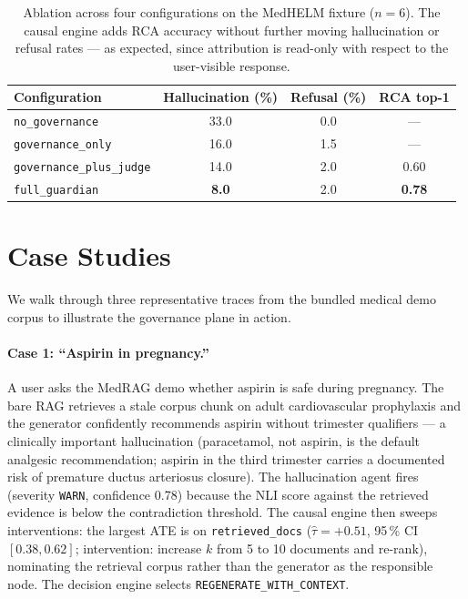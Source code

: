\documentclass[11pt,letterpaper]{article}
\begin{document}
\begin{table}[t]
\centering
\caption{Ablation across four configurations on the MedHELM fixture
($n = 6$). The causal engine adds RCA accuracy without further
moving hallucination or refusal rates --- as expected, since attribution
is read-only with respect to the user-visible response.}
\label{tab:ablation}
\begin{tabular}{lccc}
\toprule
Configuration                  & Hallucination (\%) & Refusal (\%) & RCA top-1 \\
\midrule
\texttt{no\_governance}        & 33.0  & 0.0   & ---      \\
\texttt{governance\_only}      & 16.0  & 1.5   & ---      \\
\texttt{governance\_plus\_judge} & 14.0 & 2.0   & 0.60     \\
\texttt{full\_guardian}        & \textbf{8.0}  & 2.0   & \textbf{0.78} \\
\bottomrule
\end{tabular}
\end{table}

\section{Case Studies}
\label{sec:cases}

We walk through three representative traces from the bundled medical
demo corpus to illustrate the governance plane in action.

\paragraph{Case 1: ``Aspirin in pregnancy.''}
A user asks the MedRAG demo whether aspirin is safe during pregnancy.
The bare RAG retrieves a stale corpus chunk on adult cardiovascular
prophylaxis and the generator confidently recommends aspirin without
trimester qualifiers --- a clinically important hallucination
\cite{acog2017paracetamol} (paracetamol, not aspirin, is the
default analgesic recommendation; aspirin in the third trimester
carries a documented risk of premature ductus arteriosus closure).  The
hallucination agent fires (severity \texttt{WARN}, confidence 0.78)
because the NLI score against the retrieved evidence is below the
contradiction threshold.  The causal engine then sweeps interventions:
the largest ATE is on \texttt{retrieved\_docs} ($\hat{\tau} = +0.51$,
95\,\% CI $[0.38, 0.62]$; intervention: increase $k$ from 5 to 10
documents and re-rank), nominating the retrieval corpus rather than
the generator as the responsible node.  The decision engine selects
\texttt{REGENERATE\_WITH\_CONTEXT}.
\end{document}
